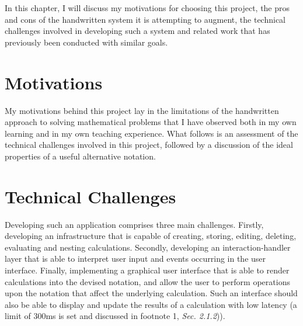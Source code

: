 \documentclass[12pt,twoside,notitlepage,xetex]{report}
\begin{document}
In this chapter, I will discuss my motivations for choosing this project, the pros and cons of the handwritten system it is attempting to augment, the technical challenges involved in developing such a system and related work that has previously been conducted with similar goals.

\section{Motivations}

My motivations behind this project lay in the limitations of the handwritten approach to solving mathematical problems that I have observed both in my own learning and in my own teaching experience.  What follows is an assessment of the technical challenges involved in this project, followed by a discussion of the ideal properties of a useful alternative notation.

\pagebreak



\section{Technical Challenges}

Developing such an application comprises three main challenges.  Firstly, developing an infrastructure that is capable of creating, storing, editing, deleting, evaluating and nesting calculations.  Secondly, developing an interaction-handler layer that is able to interpret user input and events occurring in the user interface.  Finally, implementing a graphical user interface that is able to render calculations into the devised notation, and allow the user to perform operations upon the notation that affect the underlying calculation.  Such an interface should also be able to display and update the results of a calculation with low latency (a limit of 300ms is set and discussed in footnote 1, \emph{Sec. 2.1.2})).
\end{document}
